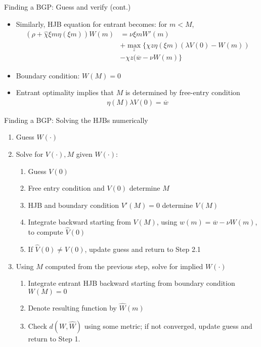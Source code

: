 \documentclass[english,usenames,dvipsnames]{beamer}
\begin{document}
\begin{frame}{Finding a BGP: Guess and verify (cont.)}
\begin{itemize}
	\small
	\item Similarly, HJB equation for entrant becomes: for $m < M$, 
	\small
	\begin{align*}
	(\rho + \hat{\chi}\xi m \eta(\xi m) ) W(m) &= \nu \xi m W'(m) \\
	&+ \max_{z} \Big\{ \chi z \eta(\xi m) (\lambda V(0) - W(m))   \\
	&- \chi z (\overline{w} - \nu W(m) \Big\}
	\end{align*}
	\item Boundary condition: $W(M) = 0$ 
	\item Entrant optimality implies that $M$ is determined by free-entry condition
	\begin{align*}
	\eta(M) \lambda V(0) = \overline{w}
	\end{align*}
\end{itemize}
\end{frame}

\begin{frame}{Finding a BGP: Solving the HJBs numerically}
\begin{enumerate}
	\item Guess $W(\cdot)$
	\item Solve for $V(\cdot),M$ given $W(\cdot)$: 
	\begin{enumerate}
		\item Guess $V(0)$
		\item Free entry condition and $V(0)$ determine $M$
		\item HJB and boundary condition $V'(M) = 0$ determine $V(M)$
		\item Integrate backward starting from $V(M)$, using $w(m) = \overline{w} - \nu W(m)$, to compute $\hat{V}(0)$
		\item If $\hat{V}(0) \ne V(0)$, update guess and return to Step 2.1
	\end{enumerate}
	\item Using $M$ computed from the previous step, solve for implied $W(\cdot)$
	\begin{enumerate}
		\item Integrate entrant HJB backward starting from boundary condition $W(M) = 0$
		\item Denote resulting function by $\hat{W}(m)$ 
		\item Check $d(W,\hat{W})$ using some metric; if not converged, update guess and return to Step 1. 
	\end{enumerate}
\end{enumerate}
\end{frame}
\end{document}
